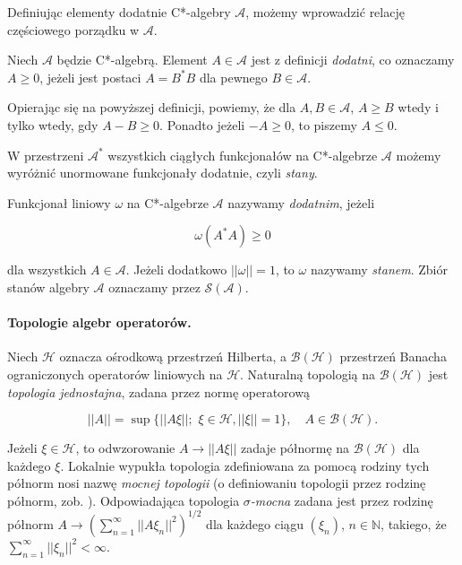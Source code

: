 Definiując elementy dodatnie C*-algebry $\mathcal{A}$,
możemy wprowadzić relację częściowego porządku w $\mathcal{A}$.

\begin{Definition}
 Niech $\mathcal{A}$ będzie C*-algebrą. Element $A \in \mathcal{A}$ jest z
definicji \emph{dodatni}, co oznaczamy $A \geq 0$, jeżeli jest postaci
$A = B^{*}B$ dla pewnego $B \in \mathcal{A}$.
\end{Definition}

Opierając się na powyższej definicji, powiemy, że dla $A, B \in \mathcal{A}$,
$A \geq B$ wtedy i tylko wtedy, gdy $A-B \geq 0$. Ponadto jeżeli $-A
\geq 0$, to piszemy $A \leq 0$.

W przestrzeni $\mathcal{A}^{*}$ wszystkich ciągłych funkcjonałów na
C*-algebrze $\mathcal{A}$ możemy wyróżnić unormowane funkcjonały dodatnie,
czyli \emph{stany}.

\begin{Definition}
 \label{def:stateOnCalg}
  Funkcjonał liniowy $\omega$ na C*-algebrze $\mathcal{A}$ nazywamy
\emph{dodatnim}, jeżeli
\begin{linenomath*}
 \begin{equation}
 \label{eq:stateOnCalg}
  \omega(A^{*}A) \geq 0
 \end{equation}
\end{linenomath*}
dla wszystkich $A \in \mathcal{A}$.
Jeżeli dodatkowo $||\omega|| = 1$, to $\omega$ nazywamy \emph{stanem}.
Zbiór stanów algebry $\mathcal{A}$ oznaczamy przez $\mathcal{S}(\mathcal{A})$.
\end{Definition}

\paragraph{Topologie algebr operatorów.}
Niech $\mathcal{H}$ oznacza ośrodkową przestrzeń Hilberta, a $\mathcal{B}(\mathcal{H})$ przestrzeń
Banacha ograniczonych operatorów liniowych na $\mathcal{H}$.
Naturalną topologią na $\mathcal{B}(\mathcal{H})$ jest \emph{topologia jednostajna}, zadana
przez normę operatorową
\begin{linenomath*}
 \begin{equation}
 \label{eq:operatorNorm}
  ||A|| = %
  \sup \{ ||A\xi||; \, \, \xi \in \mathcal{H}, %
	    ||\xi|| = 1 \}, \quad A \in \mathcal{B}(\mathcal{H}).
 \end{equation}
\end{linenomath*}

Jeżeli $\xi \in \mathcal{H}$,
to odwzorowanie $A \rightarrow ||A\xi||$ zadaje
półnormę na $\mathcal{B}(\mathcal{H})$ dla każdego $\xi$.
Lokalnie wypukła topologia zdefiniowana za
pomocą rodziny tych półnorm nosi nazwę \emph{mocnej topologii}
(o definiowaniu
topologii przez rodzinę półnorm, zob. \cite{Rudin1991}).
Odpowiadająca topologia \emph{$\sigma$-mocna} zadana jest przez
rodzinę półnorm
$A \rightarrow \left( \sum \limits_{n=1}^{\infty} ||A \xi_{n}||^{2} \right)^{1/2}$
dla każdego ciągu $(\xi_{n})$,
$n \in \mathbb{N}$, takiego, że
$\sum \limits_{n=1}^{\infty} ||\xi_{n}||^{2} < \infty$.

